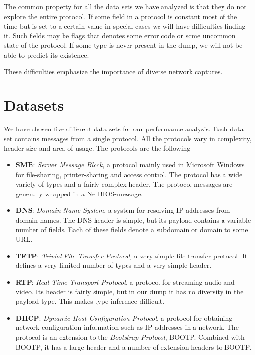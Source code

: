 \documentclass[a4paper]{report}
\begin{document}
The common property for all the data sets we have analyzed is that they do
not explore the entire protocol. If some field in a protocol is constant most
of the time but is set to a certain value in special cases we will have
difficulties finding it. Such fields may be flags that denotes some error code
or some uncommon state of the protocol. If some type is never present in the
dump, we will not be able to predict its existence.

These difficulties emphasize the importance of diverse network captures.

\section{Datasets}
We have chosen five different data sets for our performance analysis. Each
data set contains messages from a single protocol. All the protocols vary
in complexity, header size and area of usage. The protocols are the following:

\begin{itemize}
    \item \textbf{SMB}: \emph{Server Message Block}, a protocol mainly used
        in Microsoft Windows for file-sharing, printer-sharing and access
        control. The protocol has a wide variety of types and a fairly complex
        header. The protocol messages are generally wrapped in a
        NetBIOS-message.
    \item \textbf{DNS}: \emph{Domain Name System}, a system for resolving
        IP-addresses from domain names. The DNS header is simple, but its
        payload contains a variable number of fields. Each of these fields
        denote a subdomain or domain to some URL.
    \item \textbf{TFTP}: \emph{Trivial File Transfer Protocol}, a very simple
        file transfer protocol. It defines a very limited number of types
        and a very simple header.
    \item \textbf{RTP}: \emph{Real-Time Transport Protocol}, a protocol for
        streaming audio and video. Its header is fairly simple, but in our
        dump it has no diversity in the payload type. This makes type
        inference difficult.
    \item \textbf{DHCP}: \emph{Dynamic Host Configuration Protocol}, a
        protocol for obtaining network configuration information such as
        IP addresses in a network. The protocol is an extension to the
        \emph{Bootstrap Protocol}, BOOTP. Combined with BOOTP, it has a large
        header and a number of extension headers to BOOTP.
\end{itemize}
\end{document}
